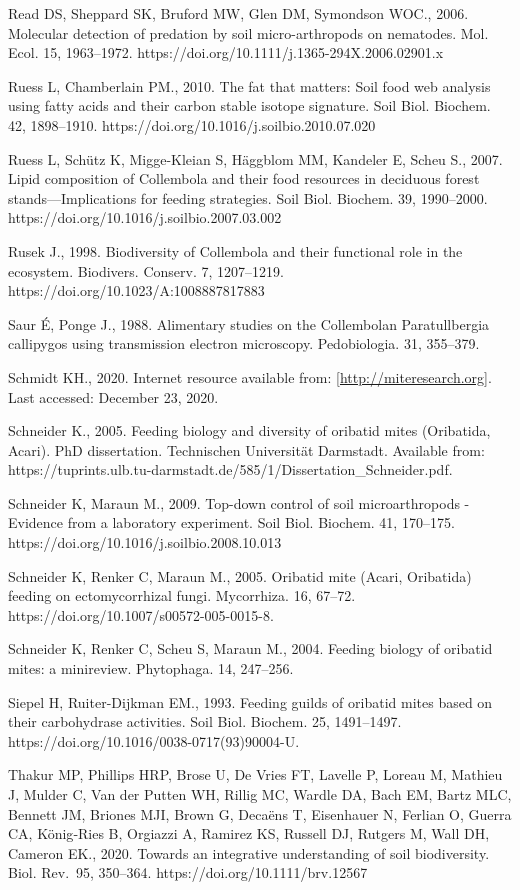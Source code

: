 \documentclass[10pt,oneside]{article}
\begin{document}
Read DS, Sheppard SK, Bruford MW, Glen DM, Symondson WOC., 2006.
Molecular detection of predation by soil micro-arthropods on nematodes.
Mol. Ecol. 15, 1963--1972.
https://doi.org/10.1111/j.1365-294X.2006.02901.x

Ruess L, Chamberlain PM., 2010. The fat that matters: Soil food web
analysis using fatty acids and their carbon stable isotope signature.
Soil Biol. Biochem. 42, 1898--1910.
https://doi.org/10.1016/j.soilbio.2010.07.020

Ruess L, Schütz K, Migge-Kleian S, Häggblom MM, Kandeler E, Scheu S.,
2007. Lipid composition of Collembola and their food resources in
deciduous forest stands---Implications for feeding strategies. Soil
Biol. Biochem. 39, 1990--2000.
https://doi.org/10.1016/j.soilbio.2007.03.002

Rusek J., 1998. Biodiversity of Collembola and their functional role in
the ecosystem. Biodivers. Conserv. 7, 1207--1219.
https://doi.org/10.1023/A:1008887817883

Saur É, Ponge J., 1988. Alimentary studies on the Collembolan
Paratullbergia callipygos using transmission electron microscopy.
Pedobiologia. 31, 355--379.

Schmidt KH., 2020. Internet resource available from:
\href{http://miteresearch.org/}{{[}http://miteresearch.org{]}}. Last
accessed: December 23, 2020.

Schneider K., 2005. Feeding biology and diversity of oribatid mites
(Oribatida, Acari). PhD dissertation. Technischen Universität Darmstadt.
Available from:
https://tuprints.ulb.tu-darmstadt.de/585/1/Dissertation\_Schneider.pdf.

Schneider K, Maraun M., 2009. Top-down control of soil microarthropods -
Evidence from a laboratory experiment. Soil Biol. Biochem. 41, 170--175.
https://doi.org/10.1016/j.soilbio.2008.10.013

Schneider K, Renker C, Maraun M., 2005. Oribatid mite (Acari, Oribatida)
feeding on ectomycorrhizal fungi. Mycorrhiza. 16, 67--72.
https://doi.org/10.1007/s00572-005-0015-8.

Schneider K, Renker C, Scheu S, Maraun M., 2004. Feeding biology of
oribatid mites: a minireview. Phytophaga. 14, 247--256.

Siepel H, Ruiter-Dijkman EM., 1993. Feeding guilds of oribatid mites
based on their carbohydrase activities. Soil Biol. Biochem. 25,
1491--1497. https://doi.org/10.1016/0038-0717(93)90004-U.

Thakur MP, Phillips HRP, Brose U, De Vries FT, Lavelle P, Loreau M,
Mathieu J, Mulder C, Van der Putten WH, Rillig MC, Wardle DA, Bach EM,
Bartz MLC, Bennett JM, Briones MJI, Brown G, Decaëns T, Eisenhauer N,
Ferlian O, Guerra CA, König‐Ries B, Orgiazzi A, Ramirez KS, Russell DJ,
Rutgers M, Wall DH, Cameron EK., 2020. Towards an integrative
understanding of soil biodiversity. Biol. Rev.~95, 350--364.
https://doi.org/10.1111/brv.12567
\end{document}

